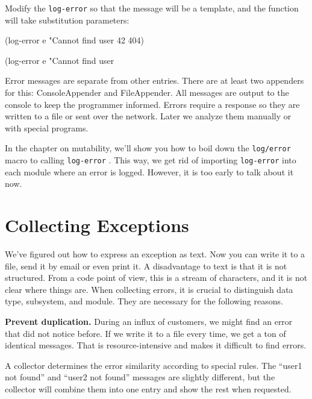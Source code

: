 \fi

Modify the \verb|log-error| so that the message will be a template, and the function will take substitution parameters:

\ifx\DEVICETYPE\MOBILE

\begin{clojure}
(log-error e
  "Cannot find user %
  42 404)
\end{clojure}

\else

\begin{clojure}
(log-error e "Cannot find user %
\end{clojure}

\fi

Error messages are separate from other entries. There are at least two appenders for this: ConsoleAppender and FileAppender. All messages are output to the console to keep the programmer informed. Errors require a response so they are written to a file or sent over the network. Later we analyze them manually or with special programs.

In the chapter on mutability, we'll show you how to boil down the \verb|log/error| macro to calling \verb|log-error| . This way, we get rid of importing \verb|log-error| into each module where an error is logged. However, it is too early to talk about it now.

\section{Collecting Exceptions}


We've figured out how to express an exception as text. Now you can write it to a file, send it by email or even print it. A disadvantage to text is that it is not structured. From a code point of view, this is a stream of characters, and it is not clear where things are. When collecting errors, it is crucial to distinguish data type, subsystem, and module. They are necessary for the following reasons.

\textbf{Prevent duplication.} During an influx of customers, we might find an error that did not notice before. If we write it to a file every time, we get a ton of identical messages. That is resource-intensive and makes it difficult to find errors.

A collector determines the error similarity according to special rules. The ``user1 not found'' and ``user2 not found'' messages are slightly different, but the collector will combine them into one entry and show the rest when requested.

